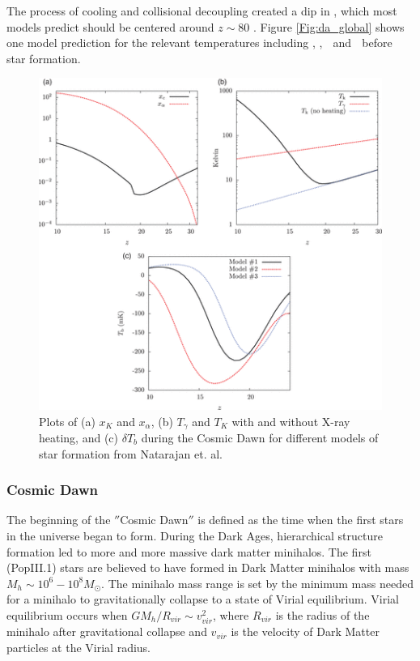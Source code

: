 The process of cooling and collisional decoupling created a dip in \ts, which most models predict should be centered around $z \sim 80 $ \cite{furlanetto_2006}. Figure \ref{Fig:da_global} shows one model prediction for the relevant temperatures including \tg, \tk, \ts $\;$ and \dtb $\;$ before star formation. 

\begin{figure}[htb]
\begin{center}
\includegraphics[width=0.95\linewidth]{Introduction/figures/ts_evolution.png}
\caption{Plots of (a) $x_K$ and $x_{\alpha}$, (b) $T_\gamma$ and $T_K$ with and without X-ray heating, and (c) $\delta T_b$ during the Cosmic Dawn for different models of star formation from Natarajan et. al. \cite{natarajan_2014}}
\label{Fig:cd_global}
\end{center}
\end{figure}

\subsubsection{Cosmic Dawn}

The beginning of the $''$Cosmic Dawn$''$ is defined as the time when the first stars in the universe began to form. During the Dark Ages, hierarchical structure formation led to more and more massive dark matter minihalos. The first (PopIII.1) stars are believed to have formed in Dark Matter minihalos with mass $ M_h \sim 10^6 - 10^8 M_{\odot}$. The minihalo mass range is set by the minimum mass needed for a minihalo to gravitationally collapse to a state of Virial equilibrium. Virial equilibrium occurs when $G M_h/R_{vir} \sim v^2_{vir}$, where $R_{vir}$ is the radius of the minihalo after gravitational collapse and $v_{vir}$ is the velocity of Dark Matter particles at the Virial radius. 

